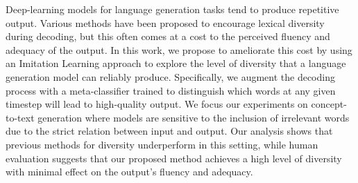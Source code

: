 Deep-learning models for language generation tasks tend to produce repetitive output. Various methods have been proposed to encourage lexical diversity during decoding, but this often comes at a cost to the perceived fluency and adequacy of the output. In this work, we propose to ameliorate this cost by using an Imitation Learning approach to explore the level of diversity that a language generation model can reliably produce. Specifically, we augment the decoding process with a meta-classifier trained to distinguish which words at any given timestep will lead to high-quality output. We focus our experiments on concept-to-text generation where models are sensitive to the inclusion of irrelevant words due to the strict relation between input and output. Our analysis shows that previous methods for diversity underperform in this setting, while human evaluation suggests that our proposed method achieves a high level of diversity with minimal effect on the output's fluency and adequacy.
